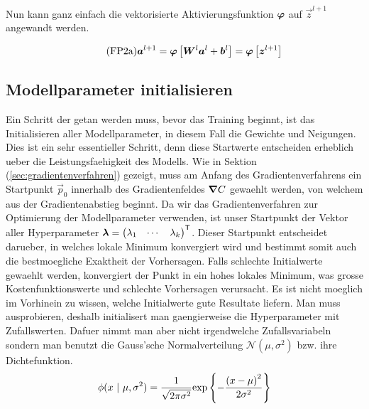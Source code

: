 Nun kann ganz einfach die vektorisierte Aktivierungsfunktion $\bm{\varphi}$ auf
$\vec{z}^{l+1}$ angewandt werden.

\begin{equation}\tag{FP2a}\label{eq:aktivierung_matrix}
  \bm{a}^{l+1} = \bm{\varphi} \left[\bm{W}^{l} \bm{a}^{l} + \bm{b}^{l} \right] = \bm{\varphi} \left[ \bm{z}^{l+1} \right]
\end{equation}

\para{}
\cite{Nielsen}

\subsection{Modellparameter initialisieren}\label{sec:parameter_initalisieren}
Ein Schritt der getan werden muss, bevor das Training beginnt, ist das
Initialisieren aller Modellparameter, in diesem Fall die Gewichte und Neigungen.
Dies ist ein sehr essentieller Schritt, denn diese Startwerte entscheiden
erheblich ueber die Leistungsfaehigkeit des Modells.
\para{}
Wie in Sektion (\ref{sec:gradientenverfahren}) gezeigt, muss am Anfang des
Gradientenverfahrens ein Startpunkt $\vec{p}_0$ innerhalb des Gradientenfeldes
$\bm{\nabla}C$ gewaehlt werden, von welchem aus der Gradientenabstieg beginnt.
Da wir das Gradientenverfahren zur Optimierung der Modellparameter verwenden,
ist unser Startpunkt der Vektor aller Hyperparameter
$\bm{\lambda} = \begin{pmatrix} \lambda_1 & \cdots & \lambda_k \end{pmatrix}^{\mathsf{T}}$.
Dieser Startpunkt entscheidet darueber, in welches lokale Minimum konvergiert
wird und bestimmt somit auch die bestmoegliche Exaktheit der Vorhersagen. Falls
schlechte Initialwerte gewaehlt werden, konvergiert der Punkt in ein hohes lokales
Minimum, was grosse Kostenfunktionswerte und schlechte Vorhersagen verursacht.
\para{}
Es ist nicht moeglich im Vorhinein zu wissen, welche Initialwerte gute Resultate
liefern. Man muss ausprobieren, deshalb initialisert man gaengierweise die
Hyperparameter mit Zufallswerten. Dafuer nimmt man aber nicht irgendwelche
Zufallsvariabeln sondern man benutzt die Gauss'sche Normalverteilung
$\mathcal{N}(\mu,\sigma^2)$ bzw. ihre Dichtefunktion.
\[\ds \phi(x\ |\ \mu,\sigma^2) = \frac{1}{\sqrt{2\pi\sigma^2}} \text{exp} \left\{-\frac{{(x-\mu)}^2}{2\sigma^2}\right\} \]
\para{}

\ifcp
\pgfplotsset{compat=1.15}
\usetikzlibrary{arrows.meta}    %

